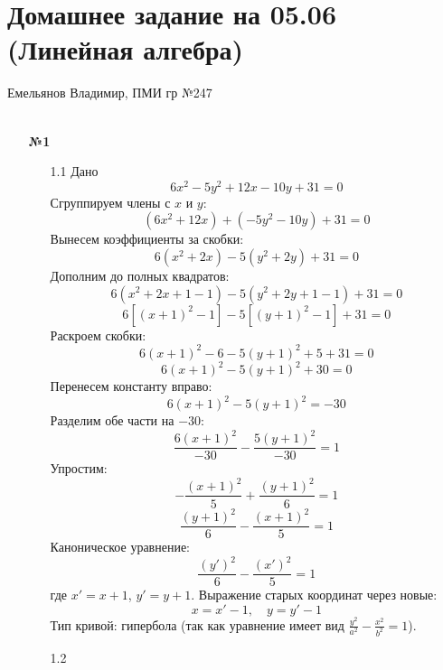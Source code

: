 \documentclass[a4paper]{article}
\begin{document}
\section*{Домашнее задание на 05.06 (Линейная алгебра)}
{\large Емельянов Владимир, ПМИ гр №247}\\\\
\begin{enumerate}
  \item[\textbf{№1}]\begin{enumerate}
    \item[1.1]Дано
    \[6x^2 - 5y^2 + 12x - 10y + 31 = 0\]
    Сгруппируем члены с \(x\) и \(y\):  
    \[(6x^2 + 12x) + (-5y^2 - 10y) + 31 = 0\]  
    Вынесем коэффициенты за скобки:  
    \[6(x^2 + 2x) - 5(y^2 + 2y) + 31 = 0\]  
    Дополним до полных квадратов:  
    \[6(x^2 + 2x + 1 - 1) - 5(y^2 + 2y + 1 - 1) + 31 = 0\]  
    \[6[(x + 1)^2 - 1] - 5[(y + 1)^2 - 1] + 31 = 0\]  
    Раскроем скобки:  
    \[6(x + 1)^2 - 6 - 5(y + 1)^2 + 5 + 31 = 0\]  
    \[6(x + 1)^2 - 5(y + 1)^2 + 30 = 0\]  
    Перенесем константу вправо:  
    \[6(x + 1)^2 - 5(y + 1)^2 = -30\]  
    Разделим обе части на \(-30\):  
    \[\frac{6(x + 1)^2}{-30} - \frac{5(y + 1)^2}{-30} = 1\]  
    Упростим:  
    \[-\frac{(x + 1)^2}{5} + \frac{(y + 1)^2}{6} = 1\]  
    \[\frac{(y + 1)^2}{6} - \frac{(x + 1)^2}{5} = 1\]  
    Каноническое уравнение:  
    \[\frac{(y')^2}{6} - \frac{(x')^2}{5} = 1\]  
    где \(x' = x + 1\), \(y' = y + 1\).  
    Выражение старых координат через новые:  
    \[x = x' - 1, \quad y = y' - 1\]  
    Тип кривой: гипербола (так как уравнение имеет вид \(\frac{y^2}{a^2} - \frac{x^2}{b^2} = 1\)).


    \item[1.2]
  \end{enumerate}
\end{enumerate}
\end{document}
